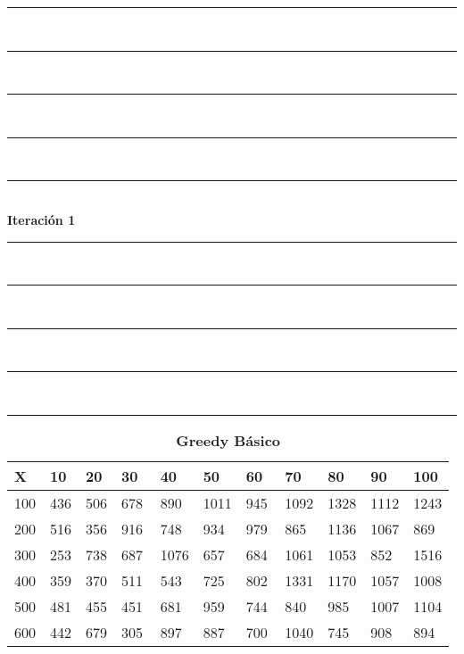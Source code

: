 \documentclass[10pt,letterpaper]{article}
\begin{document}
\newpage 
\begin{center}
\newcommand{\HRule}{\rule{\linewidth}{0.5mm}}
\center
\HRule\\[6cm]
\HRule\\[0.4cm]
\HRule\\[0.4cm]
\HRule\\[0.4cm]
\HRule\\[0.4cm]
{\centering \Huge\bfseries Iteración 1}\\[0.4cm]
\HRule\\[0.4cm]
\HRule\\[0.4cm]
\HRule\\[0.4cm]
\HRule\\[6cm]
\HRule
\end{center}
\newpage 
{}
\begin{center}
\begin{table}\renewcommand{\arraystretch}{2.5}
\caption{\large \textbf{Greedy Básico}}
\centering
\begin{tabular} { |m{0.5cm}|m{1.3cm}|m{1.3cm}|m{1.3cm}|m{1.3cm}|m{1.3cm}|m{1.3cm}|m{1.3cm}|m{1.3cm}|m{1.3cm}|m{1.3cm}|} 
\hline
\rowcolor{Gray}
\centering \textbf{X} & \centering \textbf{10} & \centering \textbf{20} & \centering \textbf{30}\ & \centering \textbf{40} & \centering \textbf{50} & \centering \textbf{60}\ & \centering \textbf{70} & \centering \textbf{80} & \centering \textbf{90}\ & \textbf{100} \\\hline
\cellcolor{Gray}100 & \Large 436 & \Large 506 & \Large 678 & \Large 890 & \Large 1011 & \Large 945 & \Large 1092 & \Large 1328 & \Large 1112 & \Large 1243 \\
\hline
\cellcolor{Gray}200 & \Large 516 & \Large 356 & \Large 916 & \Large 748 & \Large 934 & \Large 979 & \Large 865 & \Large 1136 & \Large 1067 & \Large 869 \\
\hline
\cellcolor{Gray}300 & \Large 253 & \Large 738 & \Large 687 & \Large 1076 & \Large 657 & \Large 684 & \Large 1061 & \Large 1053 & \Large 852 & \Large 1516 \\
\hline
\cellcolor{Gray}400 & \Large 359 & \Large 370 & \Large 511 & \Large 543 & \Large 725 & \Large 802 & \Large 1331 & \Large 1170 & \Large 1057 & \Large 1008 \\
\hline
\cellcolor{Gray}500 & \Large 481 & \Large 455 & \Large 451 & \Large 681 & \Large 959 & \Large 744 & \Large 840 & \Large 985 & \Large 1007 & \Large 1104 \\
\hline
\cellcolor{Gray}600 & \Large 442 & \Large 679 & \Large 305 & \Large 897 & \Large 887 & \Large 700 & \Large 1040 & \Large 745 & \Large 908 & \Large 894 \\

\end{tabular}
\end{table}
\end{center}
\end{document}
